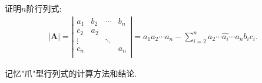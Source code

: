 \documentclass[../../main.tex]{subfiles}%
\begin{document}
\begin{proposition}\label{"爪"型行列式}
证明$n$阶行列式:
\begin{gather}
|\boldsymbol{A}|=\left| \begin{matrix}
a_1&		b_2&		\cdots&		b_n\\
c_2&		a_2&		&		\\
\vdots&		&		\ddots&		\\
c_n&		&		&		a_n\\
\end{matrix} \right|
=a_1a_2\cdots a_n-\sum_{i=2}^n{a_2}\cdots \widehat{a_i}\cdots a_nb_ic_i.
\nonumber
\end{gather}
\end{proposition}
\begin{note}
记忆"爪"型行列式的计算方法和结论.
\end{note}
\end{document}
